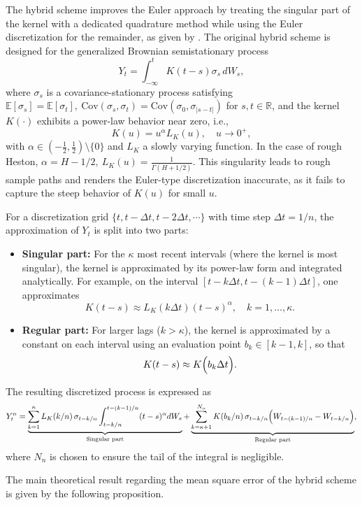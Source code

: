 \documentclass[11pt]{article}%
\theoremstyle{definition}
\begin{document}
The hybrid scheme improves the Euler approach by treating the singular part of the kernel with a dedicated quadrature method while using the Euler discretization for the remainder, as given by \cite{bennedsen_2017_FS}. The original hybrid scheme is designed for the generalized Brownian semistationary process
\[
Y_t = \int_{-\infty}^{t} K(t-s)\sigma_s\,dW_s,
\]
where \(\sigma_s\) is a covariance-stationary process satisfying \(\mathbb{E}[\sigma_s]=\mathbb{E}[\sigma_t],\ \text{Cov}(\sigma_s,\sigma_t)=\text{Cov}(\sigma_0,\sigma_{|s-t|})\) for \(s,t\in\mathbb{R}\), and the kernel $K(\cdot)$ exhibits a power-law behavior near zero, i.e.,
\[
K(u)=u^\alpha L_K(u),\quad u\to 0^+,
\]
with $\alpha\in(-\tfrac{1}{2},\tfrac{1}{2})\setminus\{0\}$ and $L_K$ a slowly varying function. In the case of rough Heston, \(\alpha = H - 1/2,\ L_K(u) = \tfrac{1}{\Gamma(H+1/2)}\). This singularity leads to rough sample paths and renders the Euler-type discretization inaccurate, as it fails to capture the steep behavior of $K(u)$ for small $u$. 

For a discretization grid \(\{t, t-\Delta t, t - 2\Delta t, \cdots\}\) with time step $\Delta t = 1/n$, the approximation of $Y_t$ is split into two parts:
\begin{itemize}
    \item \textbf{Singular part:} For the $\kappa$ most recent intervals (where the kernel is most singular), the kernel is approximated by its power-law form and integrated analytically. For example, on the interval $[t-k\Delta t, t-(k-1)\Delta t]$, one approximates
    \[
    K(t-s) \approx L_K(k\Delta t)(t-s)^\alpha,\quad k=1,\dots,\kappa.
    \]
    \item \textbf{Regular part:} For larger lags ($k>\kappa$), the kernel is approximated by a constant on each interval using an evaluation point $b_k\in[k-1,k]$, so that
    \[
    K(t-s) \approx K\Bigl(b_k \Delta t\Bigr).
    \]
\end{itemize}
The resulting discretized process is expressed as
\begin{equation}\label{eq:hybrid_scheme}
Y^n_t = \underbrace{\sum_{k=1}^{\kappa} L_K(k/n)\,\sigma_{t-k/n}\int_{t-k/n}^{t-(k-1)/n}(t-s)^\alpha dW_s}_{\text{Singular part}} + \underbrace{\sum_{k=\kappa+1}^{N_n} K(b_k/n)\,\sigma_{t-k/n}\Bigl(W_{t-(k-1)/n}-W_{t-k/n}\Bigr)}_{\text{Regular part}},
\end{equation}
where $N_n$ is chosen to ensure the tail of the integral is negligible.

The main theoretical result regarding the mean square error of the hybrid scheme is given by the following proposition.
\end{document}
